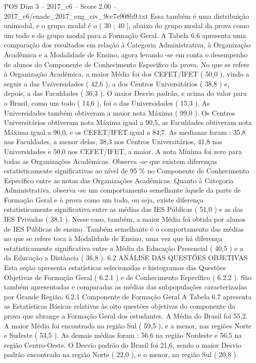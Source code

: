\begin{textsample}{POS Dim 3 – 2017\_c6 – Score 2.00 – 2017\_c6/enade\_2017\_eng\_civ\_9cc7e908b9.txt}
Essa também é uma distribuição unimodal, e o grupo modal é o ( 30 ; 40 ], abaixo do grupo modal da prova como um todo e do grupo modal para a Formação Geral.
A Tabela 6.6 apresenta uma comparação dos resultados em relação à Categoria Administrativa, à Organização Acadêmica e a Modalidade de Ensino, agora levando -se em conta o desempenho de alunos do Componente de Conhecimento Específico da prova.
No que se refere à Organização Acadêmica, a maior Média foi dos CEFET/IFET ( 50,0 ), vindo a seguir a das Universidades ( 42,6 ), a dos Centros Universitários ( 38,8 ) e, depois, a das Faculdades ( 36,3 ).
O maior Desvio padrão, e acima do valor para o Brasil, como um todo ( 14,6 ), foi o das Universidades ( 15,3 ).
As Universidades também obtiveram a maior nota Máxima ( 99,0 ).
Os Centros Universitários obtiveram nota Máxima igual a 90,5, as Faculdades obtiveram nota Máxima igual a 90,0, e os CEFET/IFET igual a 84,7.
As medianas foram : 35,8 nas Faculdades, a menor delas, 38,3 nos Centros Universitários, 41,8 nas Universidades e 50,0 nos CEFET/IFET, a maior.
A nota Mínima foi zero para todas as Organizações Acadêmicas.
Observa -se que existem diferenças estatisticamente significativas ao nível de 95 \% no Componente de Conhecimento Específico entre as notas das Organizações Acadêmicas.
Quanto à Categoria Administrativa, observa -se um comportamento semelhante àquele da parte de Formação Geral e à prova como um todo, ou seja, existe diferença estatisticamente significativa entre as médias das IES Públicas ( 51,0 ) e as das IES Privadas ( 38,1 ).
Nesse caso, também, a maior Média foi obtida por alunos de IES Públicas de ensino.
Também semelhante é o comportamento das médias no que se refere toca à Modalidade de Ensino, uma vez que há diferença estatisticamente significativa entre a Média da Educação Presencial ( 40,5 ) e a da Educação a Distância ( 36,8 ). 6.2 ANÁLISE DAS QUESTÕES OBJETIVAS Esta seção apresenta estatísticas selecionadas e histogramas das Questões Objetivas de Formação Geral ( 6.2.1 ) e de Conhecimento Específico ( 6.2.2 ).
São também apresentadas e comparadas as médias das subpopulações caracterizadas por Grande Região. 6.2.1 Componente de Formação Geral A Tabela 6.7 apresenta as Estatísticas Básicas relativas às oito questões objetivas do componente da prova que abrange a Formação Geral dos estudantes.
A Média do Brasil foi 55,2.
A maior Média foi encontrada na região Sul ( 59,5 ), e a menor, nas regiões Norte e Sudeste ( 53,5 ).
As demais médias foram : 56,6 na região Nordeste e 56,5 na região Centro-Oeste.
O Desvio padrão do Brasil foi 21,6, sendo o maior Desvio padrão encontrado na região Norte ( 22,0 ), e o menor, na região Sul ( 20,8 ).

\end{textsample}
